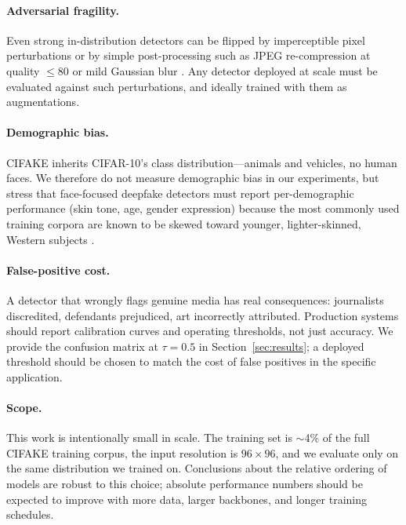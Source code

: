 \documentclass{article}
\begin{document}
\paragraph{Adversarial fragility.}
Even strong in-distribution detectors can be flipped by imperceptible
pixel perturbations or by simple post-processing such as JPEG
re-compression at quality $\leq 80$ or mild Gaussian blur
\citep{carlini2020evading}. Any detector deployed at scale must be
evaluated against such perturbations, and ideally trained with them as
augmentations.

\paragraph{Demographic bias.}
\textsc{CIFAKE} inherits CIFAR-10's class distribution---animals and
vehicles, no human faces. We therefore do not measure demographic
bias in our experiments, but stress that face-focused deepfake
detectors must report per-demographic performance (skin tone,
age, gender expression) because the most commonly used training
corpora are known to be skewed toward younger, lighter-skinned,
Western subjects \citep{karras2019style}.

\paragraph{False-positive cost.}
A detector that wrongly flags genuine media has real consequences:
journalists discredited, defendants prejudiced, art incorrectly
attributed. Production systems should report calibration curves and
operating thresholds, not just accuracy. We provide the confusion
matrix at $\tau{=}0.5$ in Section~\ref{sec:results}; a deployed
threshold should be chosen to match the cost of false positives in
the specific application.

\paragraph{Scope.}
This work is intentionally small in scale. The training set is
\(\sim\)4\% of the full \textsc{CIFAKE} training corpus, the input
resolution is $96{\times}96$, and we evaluate only on the same
distribution we trained on. Conclusions about the relative ordering of
models are robust to this choice; absolute performance numbers should
be expected to improve with more data, larger backbones, and longer
training schedules.

\end{document}

